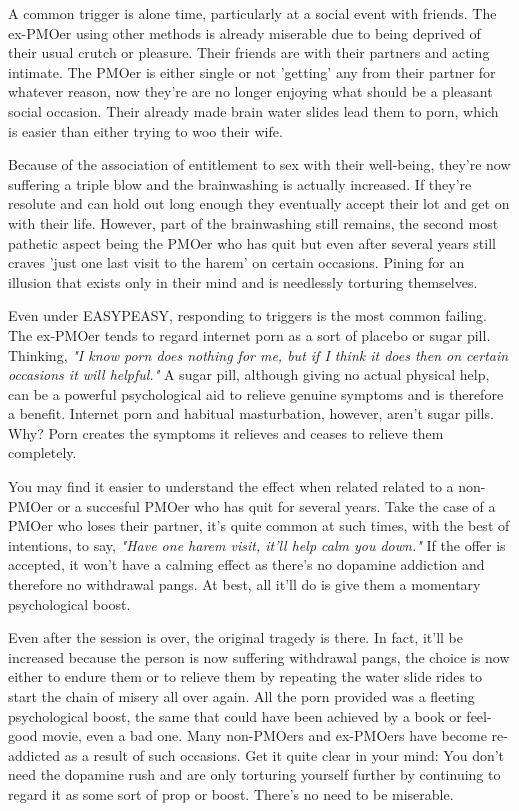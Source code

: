 \documentclass[easypeasy.tex]{subfiles}
\begin{document}
A common trigger is alone time, particularly at a social event with friends. The ex-PMOer using other methods is already miserable due to being deprived of their usual crutch or pleasure. Their friends are with their partners and acting intimate. The PMOer is either single or not 'getting' any from their partner for whatever reason, now they're are no longer enjoying what should be a pleasant social occasion. Their already made brain water slides lead them to porn, which is easier than either trying to woo their wife.

Because of the association of entitlement to sex with their well-being, they're now suffering a triple blow and the brainwashing is actually increased. If they're resolute and can hold out long enough they eventually accept their lot and get on with their life. However, part of the brainwashing still remains, the second most pathetic aspect being the PMOer who has quit but even after several years still craves 'just one last visit to the harem' on certain occasions. Pining for an illusion that exists only in their mind and is needlessly torturing themselves.

Even under EASYPEASY, responding to triggers is the most common failing. The ex-PMOer tends to regard internet porn as a sort of placebo or sugar pill. Thinking, \textit{"I know porn does nothing for me, but if I think it does then on certain occasions it will helpful."} A sugar pill, although giving no actual physical help, can be a powerful psychological aid to relieve genuine symptoms and is therefore a benefit. Internet porn and habitual masturbation, however, aren't sugar pills. Why? Porn creates the symptoms it relieves and ceases to relieve them completely.

You may find it easier to understand the effect when related related to a non-PMOer or a succesful PMOer who has quit for several years. Take the case of a PMOer who loses their partner, it's quite common at such times, with the best of intentions, to say, \textit{"Have one harem visit, it'll help calm you down."} If the offer is accepted, it won't have a calming effect as there's no dopamine addiction and therefore no withdrawal pangs. At best, all it'll do is give them a momentary psychological boost.

Even after the session is over, the original tragedy is there. In fact, it'll be increased because the person is now suffering withdrawal pangs, the choice is now either to endure them or to relieve them by repeating the water slide rides to start the chain of misery all over again. All the porn provided was a fleeting psychological boost, the same that could have been achieved by a book or feel-good movie, even a bad one. Many non-PMOers and ex-PMOers have become re-addicted as a result of such occasions. Get it quite clear in your mind: You don't need the dopamine rush and are only torturing yourself further by continuing to regard it as some sort of prop or boost. There's no need to be miserable.
\end{document}
